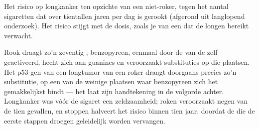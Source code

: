 \begin{omfigure}

{\small Het risico op longkanker ten opzichte van een niet-roker, tegen
het aantal sigaretten dat over tientallen jaren per dag is gerookt
(afgerond uit langlopend onderzoek). Het risico stijgt met de dosis, zoals
je van een  dat de longen bereikt verwacht.}
\end{omfigure}

\begin{example}[Tabak]\label{ex:g11:cancer:tobacco}
Rook draagt zo'n zeventig ; benzopyreen, eenmaal door de
 van de  zelf geactiveerd, hecht zich aan guanines en
veroorzaakt substituties op die plaatsen. Het p53-gen van een longtumor
van een roker draagt doorgaans precies zo'n substitutie, op een van de
weinige plaatsen waar benzopyreen zich het gemakkelijkst bindt --- het
 laat zijn handtekening in de volgorde achter. Longkanker was
vóór de sigaret een zeldzaamheid; roken veroorzaakt negen van de tien
gevallen, en stoppen halveert het risico binnen tien jaar, doordat de
 die de eerste stappen droegen geleidelijk worden vervangen.
\end{example}

